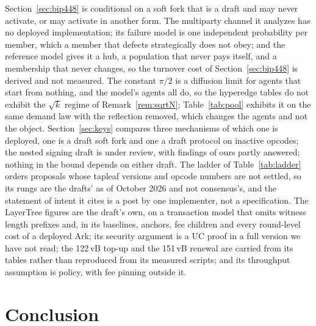 \documentclass[11pt]{article}
\theoremstyle{plain}
\theoremstyle{definition}
\theoremstyle{remark}
\begin{document}
Section~\ref{sec:bip448} is conditional on a soft fork that is a draft and may never activate, or may activate in another form. The multiparty channel it analyzes has no deployed implementation; its failure model is one independent probability per member, which a member that defects strategically does not obey; and the reference model gives it a hub, a population that never pays itself, and a membership that never changes, so the turnover cost of Section~\ref{sec:bip448} is derived and not measured. The constant $\pi/2$ is a diffusion limit for agents that start from nothing, and the model's agents all do, so the hyperedge tables do not exhibit the $\sqrt k$ regime of Remark~\ref{rem:sqrtN}; Table~\ref{tab:pool} exhibits it on the same demand law with the reflection removed, which changes the agents and not the object. Section~\ref{sec:keys} compares three mechanisms of which one is deployed, one is a draft soft fork and one a draft protocol on inactive opcodes; the nested signing draft is under review, with findings of ours partly answered; nothing in the bound depends on either draft. The ladder of Table~\ref{tab:ladder} orders proposals whose tapleaf versions and opcode numbers are not settled, so its rungs are the drafts' as of October 2026 and not consensus's, and the statement of intent it cites is a post by one implementer, not a specification. The LayerTree figures are the draft's own, on a transaction model that omits witness length prefixes and, in its baselines, anchors, fee children and every round-level cost of a deployed Ark; its security argument is a UC proof in a full version we have not read; the 122\,vB top-up and the 151\,vB renewal are carried from its tables rather than reproduced from its measured scripts; and its throughput assumption is policy, with fee pinning outside it.

\section{Conclusion}
\end{document}
